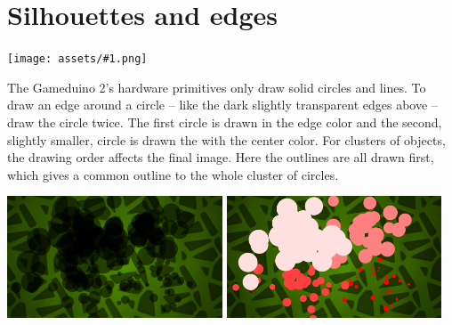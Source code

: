 \documentclass[10pt]{book}
\newcommand{\png}[1]{
\begin{center}
\texttt{[image: assets/\#1.png]}
\end{center}
}
\begin{document}
\begin{CJK}{UTF8}{gkai}
\begin{center}
\end{center}


\newpage
\section{Silhouettes and edges}
\png{outline1}

The Gameduino 2's hardware primitives only draw solid circles and lines.
To draw an edge around a circle -- like the dark slightly transparent edges above --
draw the circle twice.
The first circle is drawn in the edge color and the second, slightly smaller, circle is drawn the with the center color.
For clusters of objects, the drawing order affects the final image.
Here the outlines are all drawn first, which gives a common outline to the whole cluster of circles.


\begin{center}
\includegraphics[width=0.48\textwidth]{assets/outline3.png}
\includegraphics[width=0.48\textwidth]{assets/outline2.png}
\end{center}


\end{CJK}
\end{document}
